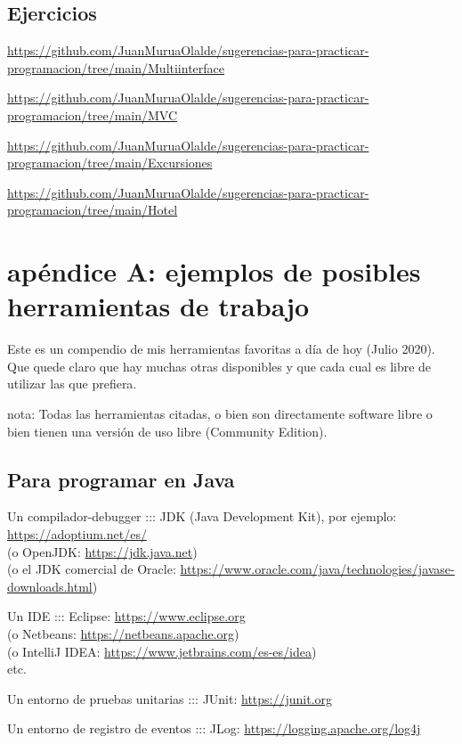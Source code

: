 \documentclass[spanish,12pt,a4paper,final,oneside]{book}
\begin{document}
\section{Ejercicios}

\url{https://github.com/JuanMuruaOlalde/sugerencias-para-practicar-programacion/tree/main/Multiinterface}

\url{https://github.com/JuanMuruaOlalde/sugerencias-para-practicar-programacion/tree/main/MVC}

\url{https://github.com/JuanMuruaOlalde/sugerencias-para-practicar-programacion/tree/main/Excursiones}

\url{https://github.com/JuanMuruaOlalde/sugerencias-para-practicar-programacion/tree/main/Hotel}




\chapter{apéndice A: ejemplos de posibles herramientas de trabajo}
Este es un compendio de mis herramientas favoritas a día de hoy (Julio 2020). Que quede claro que hay muchas otras disponibles y que cada cual es libre de utilizar las que prefiera.

nota: Todas las herramientas citadas, o bien son directamente software libre o bien tienen una versión de uso libre (Community Edition).

\section{Para programar en Java}
Un compilador-debugger ::: JDK (Java Development Kit), por ejemplo:
\\ \url{https://adoptium.net/es/}
\\ (o OpenJDK: \url{https://jdk.java.net})
\\ (o el JDK comercial de Oracle: \url{https://www.oracle.com/java/technologies/javase-downloads.html})

Un IDE ::: Eclipse: \url{https://www.eclipse.org}
\\(o Netbeans: \url{https://netbeans.apache.org})
\\(o IntelliJ IDEA: \url{https://www.jetbrains.com/es-es/idea})
\\etc.

Un entorno de pruebas unitarias ::: JUnit: \url{https://junit.org}

Un entorno de registro de eventos ::: JLog: \url{https://logging.apache.org/log4j}
\end{document}
